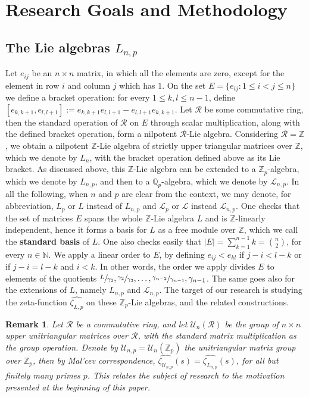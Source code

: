 \documentclass[12pt]{article}
\newtheorem{remark}[theorem]{Remark}
\begin{document}
\section{Research Goals and Methodology}
\subsection{The Lie algebras $L_{n,p}$}
Let $e_{ij}$ be an $n\times{n}$ matrix, in which all the elements are zero, except for the element in row $i$ and column $j$ which has $1$. On the set $E=\{e_{ij} : 1\leq{i}<{j}\leq{n}\}$ we define a bracket operation: for every $1\leq{k,l}\leq{n-1}$, define $[e_{k,k+1},e_{l,l+1}]:=e_{k,k+1}e_{l,l+1}-e_{l,l+1}e_{k,k+1}$. Let $\mathcal{R}$ be some commutative ring, then the standard operation of $\mathcal{R}$ on $E$ through scalar multiplication, along with the defined bracket operation, form a nilpotent $\mathcal{R}$-Lie algebra. Considering $\mathcal{R}=\mathbb{Z}$, we obtain a nilpotent $\mathbb{Z}$-Lie algebra of strictly upper triangular matrices over $\mathbb{Z}$, which we denote by $L_{n}$, with the bracket operation defined above as its Lie bracket. As discussed above, this $\mathbb{Z}$-Lie algebra can be extended to a $\mathbb{Z}_p$-algebra, which we denote by $L_{n,p}$, and then to a $\mathbb{Q}_p$-algebra, which we denote by $\mathcal{L}_{n,p}$. In all the following, when $n$ and $p$ are clear from the context, we may denote, for abbreviation, $L_{p}$ or $L$ instead of $L_{n,p}$ and $\mathcal{L}_{p}$ or $\mathcal{L}$ instead $\mathcal{L}_{n,p}$.
One checks that the set of matrices $E$ spans the whole $\mathbb{Z}$-Lie algebra $L$ and is $\mathbb{Z}$-linearly independent, hence it forms a basis for $L$ as a free module over $\mathbb{Z}$, which we call the \textbf{standard basis} of $L$. One also checks easily that $|E|=\sum_{k=1}^{n-1}k=\binom{n}{2}$, for every $n\in\mathbb{N}$. We apply a linear order to $E$, by defining $e_{ij}<e_{kl}$ if $j-i<l-k$ or if $j-i=l-k$ and $i<k$. In other words, the order we apply divides $E$ to elements of the quotients $\sfrac{L}{\gamma_2},\sfrac{\gamma_2}{\gamma_3},\dots,\sfrac{\gamma_{n-2}}{\gamma_{n-1}},\gamma_{n-1}$. The same goes also for the extensions of $L$, namely $L_{n,p}$ and $\mathcal{L}_{n,p}$. The target of our research is studying the zeta-function $\hat{\zeta_{L,p}}$ on these $\mathbb{Z}_p$-Lie algebras, and the related constructions.
\begin{remark}
Let $\mathcal{R}$ be a commutative ring, and let $\mathcal{U}_n(\mathcal{R})$ be the group of $n\times{n}$ upper unitriangular matrices over $\mathcal{R}$, with the standard matrix multiplication as the group operation. Denote by $\mathcal{U}_{n,p}=\mathcal{U}_n(\mathbb{Z}_p)$ the unitriangular matrix group over $\mathbb{Z}_p$, then by Mal'cev correspondence, $\hat{\zeta_{\mathcal{U}_{n,p}}}(s)=\hat{\zeta_{L_{n,p}}}(s)$, for all but finitely many primes $p$. This relates the subject of research to the motivation presented at the beginning of this paper.
\end{remark}
\end{document}
